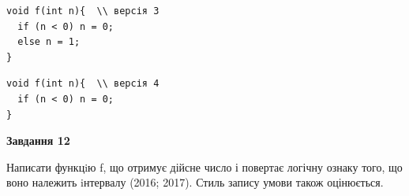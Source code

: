 \documentclass[12pt, ukrainian]{article}
\begin{document}
{\begin {large}
\begin{minipage}[t]{11.0cm}
\vspace{-8mm}\begin{verbatim}
void f(int n){  \\ версія 3
  if (n < 0) n = 0;
  else n = 1;
}
\end{verbatim}

\vspace{-8mm}\begin{verbatim}
void f(int n){  \\ версія 4
  if (n < 0) n = 0;
}
\end{verbatim}



\begin{center}
\textbf{Завдання 12}
\end{center}

Написати функцiю f, що отримує дійсне число і повертає логічну ознаку того, що воно належить iнтервалу (2016; 2017). Стиль запису умови також оцінюється.\par

\end{minipage}

\end {large}}
\newpage
\end{document}

